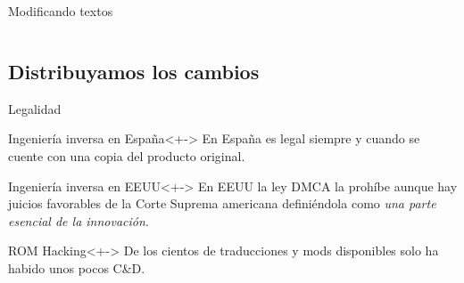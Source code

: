 \begin{frame}{Modificando textos}
\begin{columns}
\begin{column}{0.5\textwidth}
    \end{column}
    \end{columns}
\end{frame}

\subsection{Distribuyamos los cambios}
\begin{frame}{Legalidad}
    \begin{block}{Ingeniería inversa en España}<+->
        En España es legal siempre y cuando se cuente con una copia del producto original.
    \end{block}
    \begin{block}{Ingeniería inversa en EEUU}<+->
        En EEUU la ley DMCA la prohíbe aunque hay juicios favorables de la Corte Suprema americana definiéndola como \textit{una parte esencial de la innovación}.
    \end{block}
    \begin{block}{ROM Hacking}<+->
        De los cientos de traducciones y mods disponibles solo ha habido unos pocos C\&D.
    \end{block}
\end{frame}


